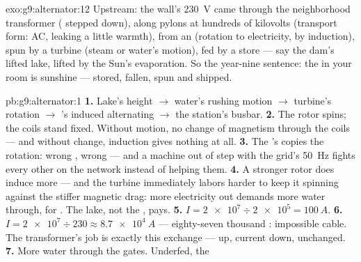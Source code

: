 \begin{solution}{exo:g9:alternator:12}
Upstream: the wall's \qty{230}{V} came through the
neighborhood transformer ( stepped down), along
pylons at hundreds of kilovolts (transport form:
 AC, leaking a little warmth), from an
 (rotation to electricity, by induction), spun by
a turbine (steam or water's motion), fed by a store --- say
the dam's lifted lake, lifted by the Sun's evaporation. So
the year-nine sentence: the  in your room is sunshine
--- stored, fallen, spun and shipped.
\end{solution}

\begin{solution}{pb:g9:alternator:1}
\textbf{1.} Lake's height $\to$ water's rushing motion
$\to$ turbine's rotation $\to$ 's induced
alternating  $\to$ the station's busbar.
\textbf{2.} The rotor  spins; the coils stand fixed.
Without motion, no change of magnetism through the coils ---
and without change, induction gives nothing at all.
\textbf{3.} The 's  copies the rotation:
wrong , wrong  --- and a machine out of step
with the grid's \qty{50}{Hz} fights every other 
on the network instead of helping them.
\textbf{4.} A stronger rotor  does induce more --- and
the turbine immediately labors harder to keep it spinning
against the stiffer magnetic drag: more electricity out
demands more water through,  for . The lake, not
the , pays.
\textbf{5.} $I = \num{2e7} \div \num{2e5} = \qty{100}{A}$.
\textbf{6.} $I = \num{2e7} \div 230 \approx \qty{8.7e4}{A}$
--- eighty-seven thousand : impossible cable. The
transformer's job is exactly this exchange ---  up,
current down,  unchanged.
\textbf{7.} More water through the gates. Underfed, the

\end{solution}
